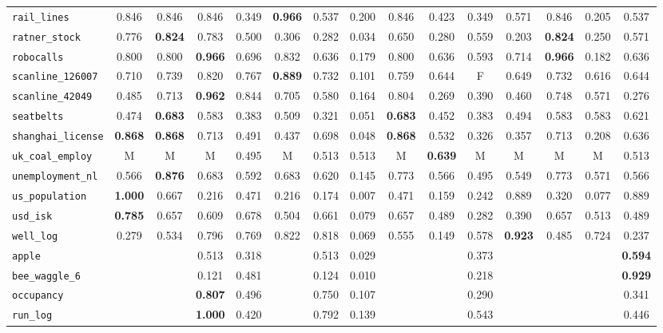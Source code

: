 \begin{tabular}{lcccccccccccccc}
\verb+rail_lines+ & 0.846 & 0.846 & 0.846 & 0.349 & \textbf{0.966} & 0.537 & 0.200 & 0.846 & 0.423 & 0.349 & 0.571 & 0.846 & 0.205 & 0.537\\
\verb+ratner_stock+ & 0.776 & \textbf{0.824} & 0.783 & 0.500 & 0.306 & 0.282 & 0.034 & 0.650 & 0.280 & 0.559 & 0.203 & \textbf{0.824} & 0.250 & 0.571\\
\verb+robocalls+ & 0.800 & 0.800 & \textbf{0.966} & 0.696 & 0.832 & 0.636 & 0.179 & 0.800 & 0.636 & 0.593 & 0.714 & \textbf{0.966} & 0.182 & 0.636\\
\verb+scanline_126007+ & 0.710 & 0.739 & 0.820 & 0.767 & \textbf{0.889} & 0.732 & 0.101 & 0.759 & 0.644 & F & 0.649 & 0.732 & 0.616 & 0.644\\
\verb+scanline_42049+ & 0.485 & 0.713 & \textbf{0.962} & 0.844 & 0.705 & 0.580 & 0.164 & 0.804 & 0.269 & 0.390 & 0.460 & 0.748 & 0.571 & 0.276\\
\verb+seatbelts+ & 0.474 & \textbf{0.683} & 0.583 & 0.383 & 0.509 & 0.321 & 0.051 & \textbf{0.683} & 0.452 & 0.383 & 0.494 & 0.583 & 0.583 & 0.621\\
\verb+shanghai_license+ & \textbf{0.868} & \textbf{0.868} & 0.713 & 0.491 & 0.437 & 0.698 & 0.048 & \textbf{0.868} & 0.532 & 0.326 & 0.357 & 0.713 & 0.208 & 0.636\\
\verb+uk_coal_employ+ & M & M & M & 0.495 & M & 0.513 & 0.513 & M & \textbf{0.639} & M & M & M & M & 0.513\\
\verb+unemployment_nl+ & 0.566 & \textbf{0.876} & 0.683 & 0.592 & 0.683 & 0.620 & 0.145 & 0.773 & 0.566 & 0.495 & 0.549 & 0.773 & 0.571 & 0.566\\
\verb+us_population+ & \textbf{1.000} & 0.667 & 0.216 & 0.471 & 0.216 & 0.174 & 0.007 & 0.471 & 0.159 & 0.242 & 0.889 & 0.320 & 0.077 & 0.889\\
\verb+usd_isk+ & \textbf{0.785} & 0.657 & 0.609 & 0.678 & 0.504 & 0.661 & 0.079 & 0.657 & 0.489 & 0.282 & 0.390 & 0.657 & 0.513 & 0.489\\
\verb+well_log+ & 0.279 & 0.534 & 0.796 & 0.769 & 0.822 & 0.818 & 0.069 & 0.555 & 0.149 & 0.578 & \textbf{0.923} & 0.485 & 0.724 & 0.237\\
\hline
\verb+apple+ &  &  & 0.513 & 0.318 &  & 0.513 & 0.029 &  &  & 0.373 &  &  &  & \textbf{0.594}\\
\verb+bee_waggle_6+ &  &  & 0.121 & 0.481 &  & 0.124 & 0.010 &  &  & 0.218 &  &  &  & \textbf{0.929}\\
\verb+occupancy+ &  &  & \textbf{0.807} & 0.496 &  & 0.750 & 0.107 &  &  & 0.290 &  &  &  & 0.341\\
\verb+run_log+ &  &  & \textbf{1.000} & 0.420 &  & 0.792 & 0.139 &  &  & 0.543 &  &  &  & 0.446\\
\hline
\end{tabular}
